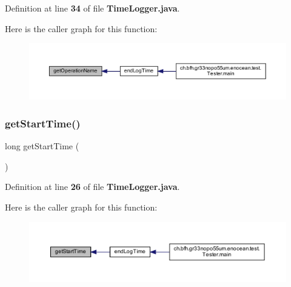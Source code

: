 Definition at line {\bf 34} of file {\bf Time\+Logger.\+java}.

Here is the caller graph for this function\+:\nopagebreak
\begin{figure}[H]
\begin{center}
\leavevmode
\includegraphics[width=350pt]{dc/d8d/classch_1_1bfh_1_1gr33nopo55um_1_1enocean_1_1helper_1_1TimeLogger_a9e8e5afa9d6290cdd84017c44eaabcac_icgraph}
\end{center}
\end{figure}
\label{classch_1_1bfh_1_1gr33nopo55um_1_1enocean_1_1helper_1_1TimeLogger_a63209df1204fc1c5d7689ead94483df0} 
\subsubsection{get\+Start\+Time()}
{\footnotesize\ttfamily long get\+Start\+Time (\begin{DoxyParamCaption}{ }\end{DoxyParamCaption})\hspace{0.3cm}{\ttfamily [private]}}



Definition at line {\bf 26} of file {\bf Time\+Logger.\+java}.

Here is the caller graph for this function\+:\nopagebreak
\begin{figure}[H]
\begin{center}
\leavevmode
\includegraphics[width=350pt]{dc/d8d/classch_1_1bfh_1_1gr33nopo55um_1_1enocean_1_1helper_1_1TimeLogger_a63209df1204fc1c5d7689ead94483df0_icgraph}
\end{center}
\end{figure}
\label{classch_1_1bfh_1_1gr33nopo55um_1_1enocean_1_1helper_1_1TimeLogger_af812cd2642dad59eb9d33ca75d9b590f} 
